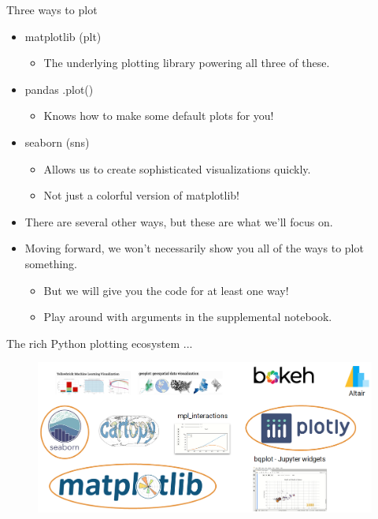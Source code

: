 \documentclass[aspectratio=169]{../latex_main/tntbeamer}  %
\begin{document}
	\begin{frame}{Three ways to plot}
	    \begin{itemize}
	        \item matplotlib (plt)
	        \begin{itemize}
	            \item The underlying plotting library powering all three of these.
	        \end{itemize}
	        \item pandas .plot()
	        \begin{itemize}
	            \item Knows how to make some default plots for you!
	        \end{itemize}
	        \item seaborn (sns)
	        \begin{itemize}
	            \item Allows us to create sophisticated visualizations quickly.
	            \item Not just a colorful version of matplotlib!
	        \end{itemize}
	        \item There are several other ways, but these are what we’ll focus on.
	        \item Moving forward, we won’t necessarily show you all of the ways to plot something.
	        \begin{itemize}
	            \item But we will give you the code for at least one way!
	            \item Play around with arguments in the supplemental notebook.
	        \end{itemize}
	    \end{itemize}
	\end{frame}
	
	\begin{frame}{The rich Python plotting ecosystem ...}
	    \begin{figure}
	        \centering
	        \includegraphics[scale=.38]{Bild24}
	    \end{figure}
	\end{frame}
	
\end{document}
